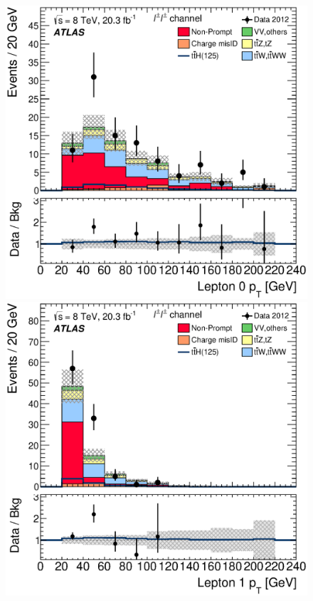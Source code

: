 %
\begin{figure}[!htbp]
  \begin{minipage}[h]{0.4\textwidth}
    \centering \includegraphics[width=\textwidth]{figs/results/results_new/2lep_SR_Lep0Pt}
  \end{minipage}\hfill
  \begin{minipage}[h]{0.4\textwidth}
    \centering \includegraphics[width=\textwidth]{figs/results/results_new/2lep_SR_Lep1Pt}

\end{minipage}
\end{figure}
